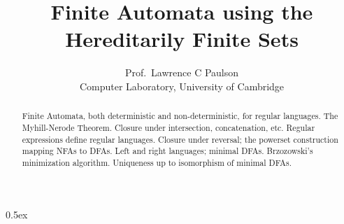 \documentclass[11pt,a4paper]{report}
\date{}
\begin{document}
\title{Finite Automata using the Hereditarily Finite Sets}
\author{Prof.\ Lawrence C Paulson\\
        Computer Laboratory, University of Cambridge}
\maketitle
\parindent 0pt\parskip 0.5ex

\begin{abstract}
Finite Automata, both deterministic and non-deterministic, for regular languages.
  The Myhill-Nerode Theorem. Closure under intersection, concatenation, etc.
  Regular expressions define regular languages. Closure under reversal;
  the powerset construction mapping NFAs to DFAs. Left and right languages; minimal DFAs.
  Brzozowski's minimization algorithm. Uniqueness up to isomorphism of minimal DFAs.
\end{abstract}



\end{document}
